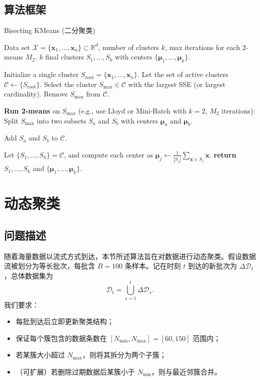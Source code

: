 \documentclass[12pt]{article}  %
\begin{document}
\subsection{算法框架}
\begin{algorithm}[H]
  \caption{Bisecting KMeans (二分聚类)}
  \begin{algorithmic}[1]
    \Require Data set $\mathcal{X} = \{\mathbf{x}_1,\dots,\mathbf{x}_n\}\subset \mathbb{R}^d$, number of clusters $k$, max iterations for each 2-means $M_2$.
    \Ensure $k$ final clusters $S_1,\dots,S_k$ with centers $\{\boldsymbol{\mu}_1,\dots,\boldsymbol{\mu}_k\}$.

    \vspace{6pt}
    \State Initialize a single cluster $S_{\text{root}} = \{\mathbf{x}_1,\dots,\mathbf{x}_n\}$.
    \State Let the set of active clusters $\mathcal{C} \gets \{S_{\text{root}}\}$.
      \State Select the cluster $S_{\max} \in \mathcal{C}$ with the largest SSE (or largest cardinality).
      \State Remove $S_{\max}$ from $\mathcal{C}$.

      \State \textbf{Run 2-means} on $S_{\max}$ (e.g., use Lloyd or Mini-Batch with $k=2$, $M_2$ iterations):
        \State \quad Split $S_{\max}$ into two subsets $S_a$ and $S_b$ with centers $\boldsymbol{\mu}_a$ and $\boldsymbol{\mu}_b$.

      \State Add $S_a$ and $S_b$ to $\mathcal{C}$.

    \EndWhile

    \State Let $\{S_1,\dots,S_k\} = \mathcal{C}$, and compute each center as $\boldsymbol{\mu}_j \gets \frac{1}{|S_j|}\sum_{\mathbf{x}\in S_j}\mathbf{x}$.
    \State \textbf{return} $S_1,\dots,S_k$ and $\{\boldsymbol{\mu}_1,\dots,\boldsymbol{\mu}_k\}$.
  \end{algorithmic}
\end{algorithm}


\section{动态聚类}
\subsection{问题描述}
随着海量数据以流式方式到达，本节所述算法旨在对数据进行动态聚类。假设数据流被划分为等长批次，每批含 $B=100$ 条样本。记在时刻 $t$ 到达的新批次为 $\Delta\mathcal{D}_t$，总体数据集为
\[
\mathcal{D}_t=\bigcup_{s=1}^t\Delta\mathcal{D}_s.
\]
我们要求：
\begin{itemize}
  \item 每批到达后立即更新聚类结构；
  \item 保证每个簇包含的数据条数在 $[N_{\min},N_{\max}]=[60,150]$ 范围内；
  \item 若某簇大小超过 $N_{\max}$，则将其拆分为两个子簇；
  \item （可扩展）若删除过期数据后某簇小于 $N_{\min}$，则与最近邻簇合并。
\end{itemize}
\end{document}
